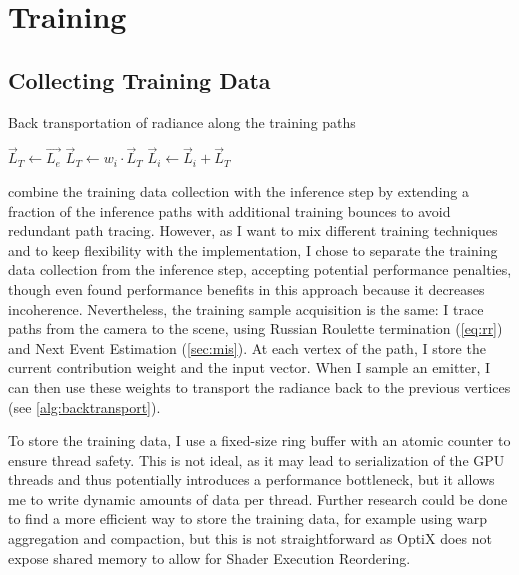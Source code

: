 \section{Training}

\subsection{Collecting Training Data}
\begin{algorithm}
    \caption{Back transportation of radiance along the training paths}
    \label{alg:backtransport}
    \begin{algorithmic}
        \State $\vec{L}_T \gets \vec{L_e}$
            \State $\vec{L}_T \gets w_i \cdot \vec{L}_T$ 
            \State $\vec{L}_i \gets \vec{L}_i + \vec{L}_T$ 
        \EndFor
    \end{algorithmic}
\end{algorithm}
\textcite{muller2021} combine the training data collection with the inference step by extending a fraction of the inference paths with additional training bounces to avoid redundant path tracing.
However, as I want to mix different training techniques and to keep flexibility with the implementation, I chose to separate the training data collection from the inference step, accepting potential performance penalties, though \textcite{dereviannykh2024} even found performance benefits in this approach because it decreases incoherence.
Nevertheless, the training sample acquisition is the same:
I trace paths from the camera to the scene, using Russian Roulette termination (\cref{eq:rr}) and Next Event Estimation (\cref{sec:mis}).
At each vertex of the path, I store the current contribution weight and the input vector.
When I sample an emitter, I can then use these weights to transport the radiance back to the previous vertices (see \cref{alg:backtransport}).

To store the training data, I use a fixed-size ring buffer with an atomic counter to ensure thread safety.
This is not ideal, as it may lead to serialization of the GPU threads and thus potentially introduces a performance bottleneck, but it allows me to write dynamic amounts of data per thread.
Further research could be done to find a more efficient way to store the training data, for example using warp aggregation and compaction, but this is not straightforward as OptiX does not expose shared memory to allow for Shader Execution Reordering.

